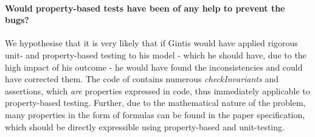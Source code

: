 \paragraph{Would property-based tests have been of any help to prevent the bugs?}
We hypothesise that it is very likely that if Gintis would have applied rigorous unit- and property-based testing to his model - which he should have, due to the high impact of his outcome - he would have found the inconsistencies and could have corrected them. The code of \cite{evensen_extensible_2010} contains numerous \textit{checkInvariants} and assertions, which \textit{are} properties expressed in code, thus immediately applicable to property-based testing. Further, due to the mathematical nature of the problem, many properties in the form of formulas can be found in the paper specification, which should be directly expressible using property-based and unit-testing.